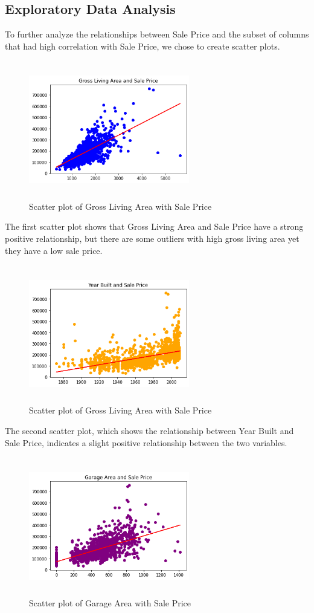 \documentclass[fleqn,10pt]{SelfArx} %
\begin{document}
\subsection{Exploratory Data Analysis}
To further analyze the relationships between Sale Price and the subset of columns that had high correlation with Sale Price, we chose to create scatter plots. 
\begin{figure}[H]
    \centering
    \includegraphics[width=7cm, height=6cm]{img/GrLivAreascatter.png}
    \caption{Scatter plot of Gross Living Area with Sale Price}
    \label{fig:my_label}
\end{figure}
The first scatter plot shows that Gross Living Area and Sale Price have a strong positive relationship, but there are some outliers with high gross living area yet they have a low sale price. 
\begin{figure}[H]
    \centering
    \includegraphics[width=7cm, height=6cm]{img/YearBuiltscatter.png}
    \caption{Scatter plot of Gross Living Area with Sale Price}
    \label{fig:my_label}
\end{figure}
The second scatter plot, which shows the relationship between Year Built and Sale Price, indicates a slight positive relationship between the two variables.
\begin{figure}[H]
    \centering
    \includegraphics[width=7cm, height=6cm]{img/GrarageAreascatter.png}
    \caption{Scatter plot of Garage Area with Sale Price}
    \label{fig:my_label}
\end{figure}
\end{document}
